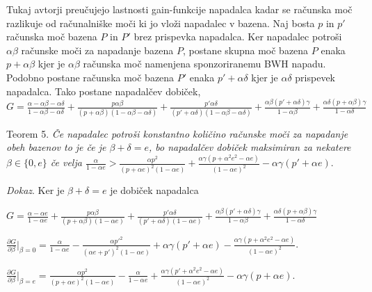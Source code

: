 \documentclass[12pt]{article}
\begin{document}
Tukaj avtorji preučujejo lastnosti gain-funkcije napadalca kadar se računska moč razlikuje od računalniške moči ki jo vloži napadalec v bazena. Naj bosta \textit{$p$} in \textit{$p'$} računska moč bazena \textit{$P$} in \textit{$P'$} brez prispevka napadalca. Ker napadalec potroši \textit{$\alpha\beta$} računske moči za napadanje bazena \textit{$P$}, postane skupna moč bazena \textit{$P$} enaka \textit{$p + \alpha\beta$} kjer je \textit{$\alpha\beta$} računska moč namenjena sponzoriranemu BWH napadu. Podobno postane računska moč bazena \textit{$P'$} enaka \textit{$p' + \alpha\delta$} kjer je \textit{$\alpha\delta$} prispevek napadalca. Tako postane napadalčev dobiček, \newline
$G = \frac{\alpha - \alpha\beta - \alpha\delta}{1 - \alpha\beta - \alpha\delta} + \frac{p\alpha\beta}{(p+\alpha\beta)(1 - \alpha\beta - \alpha\delta)} + \frac{p'\alpha\delta}{(p' + \alpha\delta)(1 - \alpha\beta - \alpha\delta)} + \frac{\alpha\beta(p' + \alpha\delta)\gamma}{1 - \alpha\beta} + \frac{\alpha\delta(p + \alpha\beta)\gamma}{1 - \alpha\delta}$
\newline

Teorem 5. \textit{Če napadalec potroši konstantno količino računske moči za napadanje obeh bazenov to je če je $\beta + \delta = e$, bo napadalčev dobiček maksimiran za nekatere $\beta \in \{0,e\}$ če velja $\frac{\alpha}{1-\alpha e} > \frac{\alpha p^2}{(p + \alpha e)^2(1 - \alpha e)} + \frac{\alpha\gamma(p+\alpha^2e^2-\alpha e)}{(1-\alpha e)^2} - \alpha\gamma(p' + \alpha e)$}.\newline

\noindent\textit{Dokaz}. Ker je \textit{$\beta + \delta = e$} je dobiček napadalca\newline

\textit{$G = \frac{\alpha - \alpha e}{1 - \alpha e} + \frac{p\alpha\beta}{(p+\alpha\beta)(1-\alpha e)} + \frac{p'\alpha\delta}{(p'+\alpha\delta)(1-\alpha e)} + \frac{\alpha\beta(p' + \alpha\delta)\gamma}{1-\alpha\beta} + \frac{\alpha\delta(p+\alpha\beta)\gamma}{1-\alpha\delta}$}\newline

$\frac{\partial G}{\partial \beta}|_{\beta=0} = \frac{\alpha}{1-\alpha e} -
\frac{\alpha p'^2}{(\alpha e + p')^2(1-\alpha e)} +
\alpha\gamma(p' + \alpha e) - 
\frac{\alpha\gamma(p+\alpha^2 e^2 -\alpha e)}{(1 - \alpha e)^2}$.\newline

$\frac{\partial G}{\partial \beta}|_{\beta=e} = 
\frac{\alpha p^2}{(p+\alpha e)^2(1-\alpha e)} - \frac{\alpha}{1 - \alpha e} +
\frac{\alpha\gamma(p'+\alpha^2 e^2 -\alpha e)}
{(1 - \alpha e)^2} -
\alpha\gamma(p+ \alpha e)$.\newline
\end{document}
